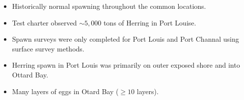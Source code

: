 \begin{itemize}
\item Historically normal spawning throughout the common locations.
\item Test charter observed $\sim 5,000$ tons of Herring in Port Louise.
\item Spawn surveys were only completed for Port Louis and Port Channal using surface survey methods.
\item Herring spawn in Port Louis was primarily on outer exposed shore and into Ottard Bay.
\item Many layers of eggs in Otard Bay ($\geq 10$ layers).
\end{itemize}